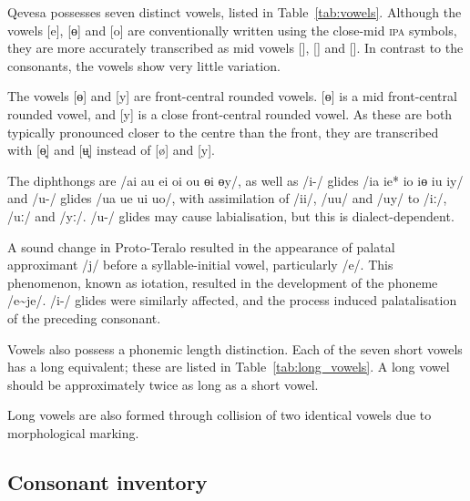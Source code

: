 \documentclass[grammar]{subfiles}
\begin{document}
  Qevesa possesses seven distinct vowels, listed in Table~\ref{tab:vowels}.  Although the vowels [e], [ɵ] and [o] are conventionally written using the close-mid \textsc{ipa} symbols, they are more accurately transcribed as mid vowels [], [] and [].  In contrast to the consonants, the vowels show very little variation.

  The vowels [ɵ] and [y] are front-central rounded vowels.  [ɵ] is a mid front-central rounded vowel, and [y] is a close front-central rounded vowel.  As these are both typically pronounced closer to the centre than the front, they are transcribed with [ɵ̟] and [ʉ̟] instead of [ø] and [y].

  The diphthongs are /ai au ei oi ou ɵi ɵy/, as well as /i-/ glides /ia ie* io iɵ iu iy/ and /u-/ glides /ua ue ui uo/, with assimilation of /ii/, /uu/ and /uy/ to /iː/, /uː/ and /yː/.  /u-/ glides may cause labialisation, but this is dialect-dependent.  

  A sound change in Proto-Teralo resulted in the appearance of palatal approximant /j/ before a syllable-initial vowel, particularly /e/.  This phenomenon, known as iotation, resulted in the development of the phoneme /\superj e\textasciitilde je/.  /i-/ glides were similarly affected, and the process induced palatalisation of the preceding consonant.

  Vowels also possess a phonemic length distinction.  Each of the seven short vowels has a long equivalent; these are listed in Table~\ref{tab:long_vowels}.  A long vowel should be approximately twice as long as a short vowel.

  Long vowels are also formed through collision of two identical vowels due to morphological marking.

  \subsection{Consonant inventory}
  \label{ssec:consonants}
\end{document}
